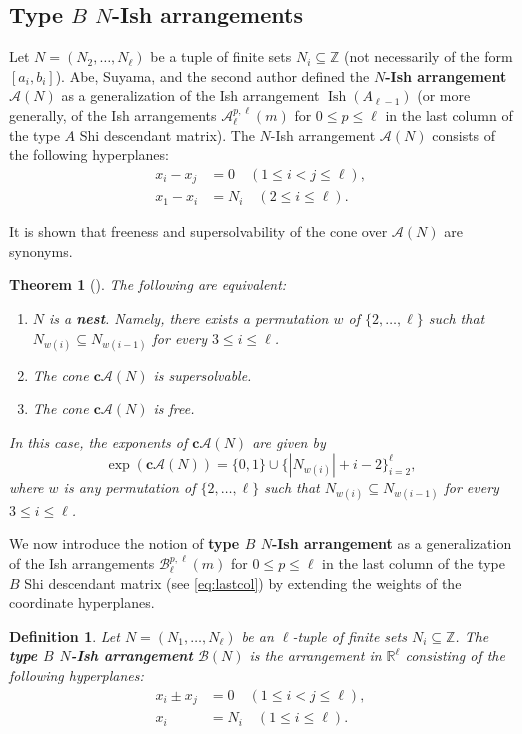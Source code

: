 \documentclass[11pt]{article}
\newtheorem{definition}[theo]{Definition}
\newtheorem{theorem}[theo]{Theorem}
\theoremstyle{definition}
\numberwithin{equation}{section}
\DeclareMathOperator{\Ish}{Ish}
\newcommand{\A}{\mathcal{A}}
\newcommand{\B}{\mathcal{B}}
\newcommand{\Z}{\mathbb{Z}}
\newcommand{\tbf}{\textbf}
\begin{document}
\subsection{Type \texorpdfstring{$B$}{B} \texorpdfstring{$N$}{N}-Ish arrangements}
\label{subsec:BN-Ish}
Let $N = (N_{2}, \dots, N_{\ell})$ be a tuple of finite sets $N_{i} \subseteq \mathbb{Z}$ (not necessarily of the form $[a_i,b_i]$). 
Abe, Suyama, and the second author \cite{AST17} defined the \tbf{$N$-Ish arrangement} $\A(N)$ as a generalization of the Ish arrangement $\Ish(A_{\ell-1}) $ (or more generally, of the Ish arrangements $  \A^{p,\ell}_\ell(m)$ for $0 \le p \le \ell$ in the last column of the type $A$ Shi descendant matrix).
The $N$-Ish arrangement $\A(N)$ consists of the following hyperplanes: 
\begin{align*}
x_{i}-x_{j} &= 0 \quad (1 \leq i < j \leq \ell), \\
x_{1}-x_{i} &= N_{i} \quad (2 \leq i \leq \ell).  
\end{align*}

It is shown that freeness and supersolvability of the cone over $\A(N)$ are synonyms. 

\begin{theorem}[{\cite[Theorems 1.3 and 1.4]{AST17}}]\label{thm:AN-Ish}
The following are equivalent: 
\begin{enumerate}[(1)]
\item $N$ is a \tbf{nest}. 
Namely, there exists a permutation $w$ of $\{2, \dots, \ell\}$ such that $N_{w(i)} \subseteq N_{w(i-1)}$ for every $3 \le  i \leq \ell$. 
\item  The cone $\tbf{c}\A(N)$ is supersolvable.
\item The cone $\tbf{c}\A(N)$  is  free.
\end{enumerate}
In this case, the exponents of  $\tbf{c}\A(N)$ are given by 
$$\exp(\tbf{c}\A(N)) = \{0,1\} \cup \{| N_{w(i)}| + i-2\}_{i=2}^\ell,$$ 
where  $w$ is any permutation of $\{2, \dots, \ell\}$ such that $N_{w(i)} \subseteq N_{w(i-1)}$ for every $3 \le  i \leq \ell$.
\end{theorem}

We now introduce the notion of \tbf{type $B$ $N$-Ish arrangement} as a generalization of the Ish arrangements $  \B^{p,\ell}_\ell(m)$ for $0 \le p \le \ell$ in the last column of the type $B$ Shi descendant matrix (see \eqref{eq:lastcol}) by extending the weights of the coordinate hyperplanes.
\begin{definition}
\label{def:N-Ish-B}
Let $N = (N_1, \ldots, N_\ell)$ be an $\ell$-tuple of finite sets $N_i\subseteq\Z$. 
The  \tbf{type $B$ $N$-Ish arrangement} $\B(N)$ is the arrangement  in $ \mathbb{R}^{\ell} $
consisting of the following hyperplanes:
\begin{align*}
x_{i}\pm x_{j} &= 0\quad  (1 \leq i < j \leq \ell), \\
x_i&=  N_i \quad (1 \le  i \leq \ell).
\end{align*}
\end{definition}
\end{document}
